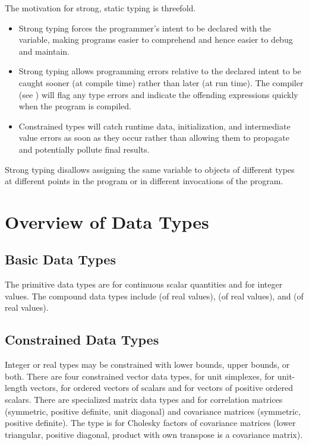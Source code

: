 The motivation for strong, static typing is threefold.  
%
\begin{itemize}
\item Strong typing forces the programmer's intent to be declared with
  the variable, making programs easier to comprehend and hence easier
  to debug and maintain.
\item Strong typing allows programming errors relative to the
  declared intent to be caught sooner (at compile time) rather than
  later (at run time).  The \Stan compiler (see )
  will flag any type errors and indicate the offending expressions
  quickly when the program is compiled.
\item Constrained types will catch runtime data, initialization, and
  intermediate value errors as soon as they occur rather than allowing
  them to propagate and potentially pollute final results.
\end{itemize}
%
Strong typing disallows assigning the same variable to objects of
different types at different points in the program or in different
invocations of the program.

\section{Overview of Data Types}

\subsection{Basic Data Types}

The primitive \Stan data types are  for continuous scalar
quantities and  for integer values.  The compound data
types include  (of real values),  (of
real values), and  (of real values).

\subsection{Constrained Data Types}

Integer or real types may be constrained with lower bounds, upper
bounds, or both.  There are four constrained vector data types,
 for unit simplexes,  for unit-length
vectors,  for ordered vectors of scalars and
 for vectors of positive ordered scalars.
There are specialized matrix data types  and
 for correlation matrices (symmetric, positive
definite, unit diagonal) and covariance matrices (symmetric, positive
definite).  The type  is for Cholesky
factors of covariance matrices (lower triangular, positive diagonal,
product with own transpose is a covariance matrix).


